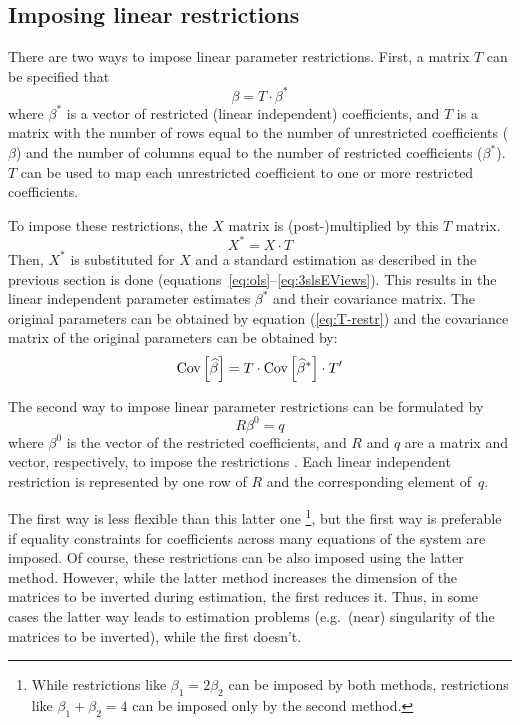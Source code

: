 \subsection{Imposing linear restrictions}\label{sec:Restrictions}

There are two ways to impose linear parameter restrictions.
First, a matrix $T$ can be specified that
\begin{equation}
   \beta = T \cdot \beta^* \label{eq:T-restr} 
\end{equation}
where $\beta^*$ is a vector of restricted (linear independent) coefficients,
and $T$ is a matrix with the number of rows equal to the number of
unrestricted coefficients ($\beta$) and
the number of columns equal to the number of restricted coefficients
($\beta^*$).
$T$ can be used to map each unrestricted coefficient to one or more
restricted coefficients.

To impose these restrictions, the $X$ matrix is
(post-)multiplied by this $T$ matrix.
\begin{equation}
    X^* = X \cdot T
\end{equation}
Then, $X^*$ is substituted for $X$ and a standard estimation as described
in the previous section is done
(equations~\ref{eq:ols}--\ref{eq:3slsEViews}).
This results in the linear independent parameter estimates $\beta^*$ and
their covariance matrix.
The original parameters can be obtained by equation (\ref{eq:T-restr})
and the covariance matrix of the original parameters
can be obtained by:
\begin{equation}
   \text{Cov} \left[ \widehat{\beta} \right] = T \cdot \text{Cov} \left[ \widehat{\beta}^* \right] \cdot T'
\end{equation}

The second way to impose linear parameter restrictions
can be formulated by
\begin{equation}
   R \beta^0 = q
\end{equation}
where $\beta^0$ is the vector of the restricted coefficients, 
and $R$ and $q$ are a matrix and vector, respectively,
to impose the restrictions \citep[see][p.\ 100]{greene03}.
Each linear independent restriction is represented by one row of $R$
and the corresponding element of~$q$.

The first way is less flexible than this latter one%
\footnote{
While restrictions like $\beta_1 = 2 \beta_2$ can be imposed by
both methods,
restrictions like $\beta_1 + \beta_2 = 4$ can be imposed only
by the second method.
}, 
but the first way is preferable if equality constraints for coefficients
across many equations of the system are imposed. 
Of course, these restrictions can be also imposed using
the latter method.
However, while the latter method increases the dimension of the 
matrices to be inverted during estimation, the first reduces it. 
Thus, in some cases the latter way leads to estimation problems
(e.g.\ (near) singularity of the matrices to be inverted),
while the first doesn't.


